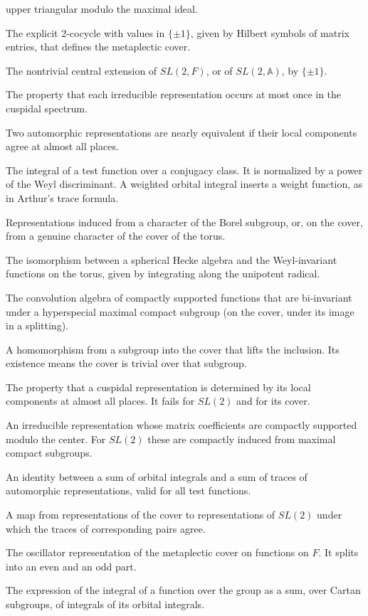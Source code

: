 \documentclass[12pt,letterpaper]{book}
\theoremstyle{plain}
\theoremstyle{definition}
\theoremstyle{remark}
\theoremstyle{remark}
\begin{document}
\begin{description}
upper triangular modulo the maximal ideal.
\item[Kubota cocycle.] The explicit 2-cocycle with values in $\{\pm1\}$,
given by Hilbert symbols of matrix entries, that defines the metaplectic
cover.
\item[Metaplectic cover.] The nontrivial central extension of $SL(2,F)$, or
of $SL(2,{\mathbb A})$, by $\{\pm1\}$.
\item[Multiplicity one.] The property that each irreducible representation
occurs at most once in the cuspidal spectrum.
\item[Near equivalence.] Two automorphic representations are nearly
equivalent if their local components agree at almost all places.
\item[Orbital integral.] The integral of a test function over a conjugacy
class. It is normalized by a power of the Weyl discriminant. A weighted
orbital integral inserts a weight function, as in Arthur's trace formula.
\item[Principal series.] Representations induced from a character of the
Borel subgroup, or, on the cover, from a genuine character of the cover of
the torus.
\item[Satake isomorphism.] The isomorphism between a spherical Hecke
algebra and the Weyl-invariant functions on the torus, given by integrating
along the unipotent radical.
\item[Spherical Hecke algebra.] The convolution algebra of compactly
supported functions that are bi-invariant under a hyperspecial maximal
compact subgroup (on the cover, under its image in a splitting).
\item[Splitting.] A homomorphism from a subgroup into the cover that lifts
the inclusion. Its existence means the cover is trivial over that subgroup.
\item[Strong multiplicity one.] The property that a cuspidal representation
is determined by its local components at almost all places. It fails for
$SL(2)$ and for its cover.
\item[Supercuspidal representation.] An irreducible representation whose
matrix coefficients are compactly supported modulo the center. For $SL(2)$
these are compactly induced from maximal compact subgroups.
\item[Trace formula.] An identity between a sum of orbital integrals and a
sum of traces of automorphic representations, valid for all test
functions.
\item[Transfer.] A map from representations of the cover to
representations of $SL(2)$ under which the traces of corresponding pairs
agree.
\item[Weil representation.] The oscillator representation of the
metaplectic cover on functions on $F$. It splits into an even and an odd
part.
\item[Weyl integration formula.] The expression of the integral of a
function over the group as a sum, over Cartan subgroups, of integrals of
its orbital integrals.
\end{description}
\end{document}
